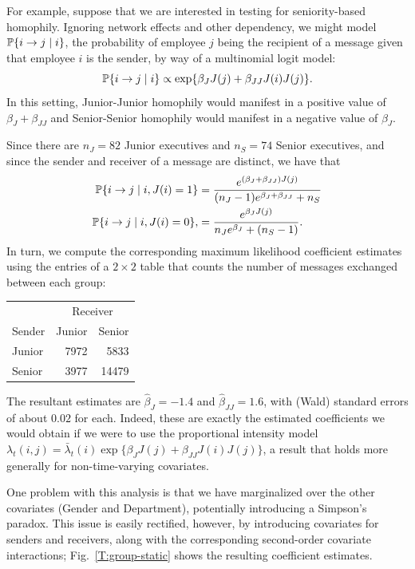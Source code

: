 \documentclass[final]{statsoc}
\begin{document}
For example, suppose that we are interested in testing for seniority-based homophily.  Ignoring
network effects and other dependency, we might model $\mathbb{P}\{ i \to j \mid i
\}$, the probability of employee $j$ being the recipient of a message given
that employee $i$ is the sender, by way of a multinomial logit model:
\[
  \mathbb{P}\{ i \to j \mid i \}
    \propto \exp\{ \beta_J J(j) + \beta_{JJ} J(i) J(j) \}.
\]
In this setting,
Junior-Junior homophily would manifest in a positive value of
$\beta_{J} + \beta_{JJ}$ and Senior-Senior homophily would manifest in
a negative value of $\beta_J$.

Since there are $n_J = 82$ Junior
executives and $n_S = 74$ Senior executives, and since the sender and
receiver of a message are distinct, we have that
\begin{align*}
  \mathbb{P}\{ i \to j \mid i, J(i) = 1 \}
    &=
      \frac{e^{(\beta_J + \beta_{JJ}) J(j)}}
           {(n_J - 1) e^{\beta_J + \beta_{JJ}} + n_S} \\
  \mathbb{P}\{ i \to j \mid i, J(i) = 0 \},
    &=
      \frac{e^{\beta_J J(j)}}
           {n_J e^{\beta_J} + (n_S - 1)}.
\end{align*}
In turn, we compute the corresponding maximum likelihood coefficient estimates using the
entries of a $2 \times 2$ table that counts the number of messages exchanged
between each group:
\begin{center}
\begin{tabular}{lrr}
  \toprule
  & \multicolumn{2}{c}{Receiver} \\
  \cmidrule(l){2-3}
  Sender & Junior & Senior \\
  \midrule
  Junior &  7972  &  5833 \\
  Senior &  3977  & 14479 \\
  \bottomrule
\end{tabular}
\end{center}
The resultant estimates are $\hat \beta_{J} = -1.4$ and
$\hat \beta_{JJ} = 1.6$, with (Wald) standard errors of about $0.02$
for each.  Indeed, these are exactly the estimated coefficients we would
obtain if we were to use the proportional intensity model
$\lambda_t(i,j) = \bar \lambda_t(i) \exp\{ \beta_J J(j) + \beta_{JJ} J(i) J(j)
\}$, a result that holds more generally for non-time-varying covariates.

One problem with this analysis is that we have marginalized over the
other covariates (Gender and Department), potentially introducing a Simpson's
paradox.  This issue is easily rectified, however, by introducing covariates for senders and
receivers, along with the corresponding second-order covariate interactions;
Fig.~\ref{T:group-static} shows the resulting coefficient estimates.
\end{document}
